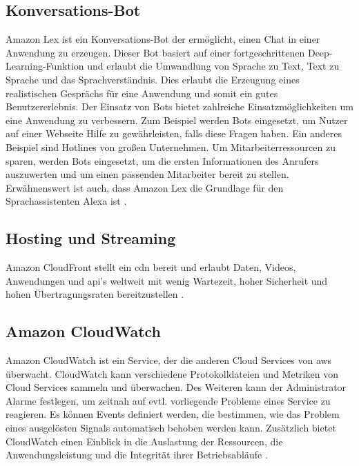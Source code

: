 \subsection{Konversations-Bot}
Amazon Lex ist ein Konversations-Bot der ermöglicht, einen Chat in einer Anwendung zu erzeugen. Dieser Bot basiert auf einer fortgeschrittenen Deep-Learning-Funktion und erlaubt die Umwandlung von Sprache zu Text, Text zu Sprache und das Sprachverständnis. Dies erlaubt die Erzeugung eines realistischen Gesprächs für eine Anwendung und somit ein gutes Benutzererlebnis. Der Einsatz von Bots bietet zahlreiche Einsatzmöglichkeiten um eine Anwendung zu verbessern. Zum Beispiel werden Bots eingesetzt, um Nutzer auf einer Webseite Hilfe zu gewährleisten, falls diese Fragen haben. Ein anderes Beispiel sind Hotlines von großen Unternehmen. Um Mitarbeiterressourcen zu sparen, werden Bots eingesetzt, um die ersten Informationen des Anrufers auszuwerten und um einen passenden Mitarbeiter bereit zu stellen. Erwähnenswert ist auch, dass Amazon Lex die Grundlage für den Sprachassistenten Alexa ist \cite{AmazonLex}.

\subsection{Hosting und Streaming}
Amazon CloudFront stellt ein \gls{cdn} bereit und erlaubt Daten, Videos, Anwendungen und \gls{api}'s weltweit mit wenig Wartezeit, hoher Sicherheit und hohen Übertragungsraten bereitzustellen \cite{AmazonCloudFront}. 

\subsection{Amazon CloudWatch}
Amazon CloudWatch ist ein Service, der die anderen Cloud Services von \gls{aws} überwacht. CloudWatch kann verschiedene Protokolldateien und Metriken von Cloud Services sammeln und überwachen. Des Weiteren kann der Administrator Alarme festlegen, um zeitnah auf evtl. vorliegende Probleme eines Service zu reagieren. Es können Events definiert werden, die bestimmen, wie das Problem eines ausgelösten Signals automatisch behoben werden kann. Zusätzlich bietet CloudWatch einen Einblick in die Auslastung der Ressourcen, die Anwendungsleistung und die Integrität ihrer Betriebsabläufe \cite{AmazonCloudWatch}.
